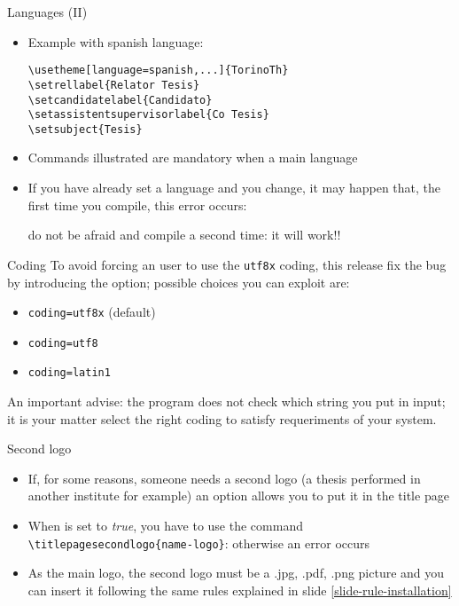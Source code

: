 \begin{frame}[t,fragile]{Languages (II)}
\begin{itemize}
\item Example with spanish language:
\begin{verbatim}
\usetheme[language=spanish,...]{TorinoTh}
\setrellabel{Relator Tesis}
\setcandidatelabel{Candidato}
\setassistentsupervisorlabel{Co Tesis}
\setsubject{Tesis}
\end{verbatim}
\item Commands illustrated are mandatory when  a main language
\item If you have already set a language and you change, it may happen that, the first time you compile, this error occurs: \begin{flushleft}
\end{flushleft}
do not be afraid and compile a second time: it will work!!
\end{itemize}
\end{frame}

\begin{frame}[t,fragile]{Coding}
To avoid forcing an user to use the \verb!utf8x! coding, this release fix the bug by introducing the  option; possible choices you can exploit are:
\begin{itemize}
\item \verb!coding=utf8x! (default)
\item \verb!coding=utf8! 
\item \verb!coding=latin1! 
\end{itemize}
An important advise: the program does not check which string you put in input; it is your matter select the right coding to satisfy requeriments of your system.
\end{frame}

\begin{frame}[t,fragile]{Second logo}
\begin{itemize}
\item If, for some reasons, someone needs a second logo (a thesis performed in another institute for example) an option allows you to put it in the title page
\item When  is set to \emph{true}, you have to use the command \verb!\titlepagesecondlogo{name-logo}!: otherwise an error occurs
\item As the main logo, the second logo must be a .jpg, .pdf, .png picture and you can insert it following the same rules explained in slide \ref{slide-rule-installation}
\end{itemize}
\end{frame}


